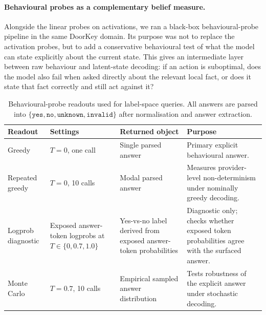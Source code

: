 %

\paragraph{Behavioural probes as a complementary belief measure.}
Alongside the linear probes on activations, we ran a black-box behavioural-probe pipeline in
the same DoorKey domain. Its purpose was not to replace the activation probes, but to add a
conservative behavioural test of what the model can state explicitly about the current state.
This gives an intermediate layer between raw behaviour and latent-state decoding: if an
action is suboptimal, does the model also fail when asked directly about the relevant local
fact, or does it state that fact correctly and still act against it?

\begin{table}[h]
\centering
\small
\begin{tabular}{p{3.0cm} p{2.1cm} p{3.7cm} p{5.0cm}}
\toprule
Readout & Settings & Returned object & Purpose \\
\midrule
Greedy & $T=0$, one call & Single parsed answer & Primary explicit behavioural answer. \\
Repeated greedy & $T=0$, 10 calls & Modal parsed answer & Measures provider-level non-determinism under nominally greedy decoding. \\
Logprob diagnostic & Exposed answer-token logprobs at $T \in \{0, 0.7, 1.0\}$ & Yes-vs-no label derived from exposed answer-token probabilities & Diagnostic only; checks whether exposed token probabilities agree with the surfaced answer. \\
Monte Carlo & $T=0.7$, 10 calls & Empirical sampled answer distribution & Tests robustness of the explicit answer under stochastic decoding. \\
\bottomrule
\end{tabular}
\caption{Behavioural-probe readouts used for label-space queries. All answers are parsed into
$\{\texttt{yes}, \texttt{no}, \texttt{unknown}, \texttt{invalid}\}$ after normalisation and
answer extraction.}
\label{tab:bp-readouts}
\end{table}

